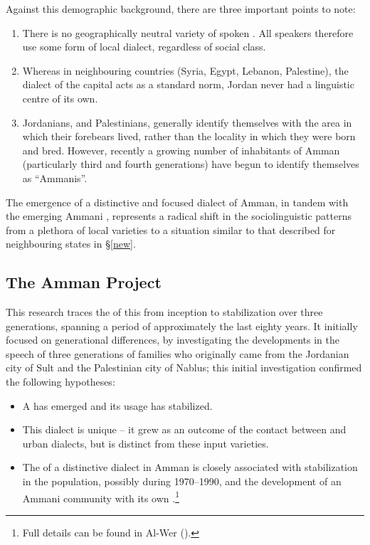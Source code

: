 \documentclass[output=paper]{langsci/langscibook}
\begin{document}
Against this demographic background, there are three important points to note:

\begin{enumerate}
\item 
There is no geographically neutral variety of spoken  . All speakers therefore use some form of local dialect, regardless of social class.

\item 
Whereas in neighbouring countries (Syria, Egypt, Lebanon, Palestine), the dialect of the capital acts as a standard  norm, Jordan never had a linguistic centre of its own.

\item 
Jordanians, and Palestinians, generally identify themselves with the area in which their forebears lived, rather than the locality in which they were born and bred. However, recently a growing number of inhabitants of Amman (particularly third and fourth generations) have begun to identify themselves as ``Ammanis''.

\end{enumerate}

The emergence of a distinctive and focused dialect of Amman, in tandem with the emerging Ammani , represents a radical shift in the sociolinguistic patterns from a plethora of local varieties to a situation similar to that described for neighbouring states in §\ref{new}.

\subsection{The Amman Project}

This research traces the  of this  from inception to stabilization over three generations, spanning a period of approximately the last eighty years. It initially focused on generational differences, by investigating the developments in the speech of three generations of families who originally came from the Jordanian city of Sult and the Palestinian city of Nablus; this initial investigation confirmed the following hypotheses:

\begin{itemize}
\item[] 
A  has emerged and its usage has stabilized.

\item[]
This dialect is unique -- it grew as an outcome of the contact between  and urban  dialects, but is distinct from these input varieties.

\item[] 
The  of a distinctive dialect in Amman is closely associated with  stabilization in the population, possibly during 1970–1990, and the development of an Ammani community with its own .\footnote{Full details can be found in Al-Wer (\citeyear{Al-Wer2002,Al-Wer2003kum}).}

\end{itemize}
\end{document}
